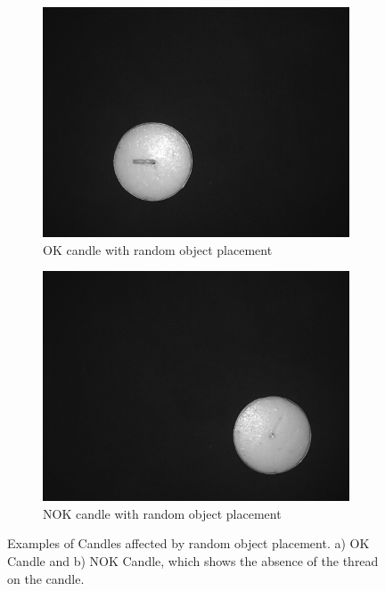 \documentclass[12pt,DIV14,BCOR12mm,a4paper,footinclude=false,headinclude,parskip=half-,twoside,openright,cleardoublepage=empty,toc=index,bibliography=totoc,listof=totoc]{scrreprt}
\numberwithin{equation}{chapter}
\begin{document}
\begin{enumerate}
	\begin{figure}
		\centering
		\begin{subfigure}[b]{0.45\textwidth}
			\centering
			\includegraphics[scale=0.15]{../media/Candles-influence-random-OK.png}
			\caption{OK candle with random object placement}
		\end{subfigure}
		\hfill
		\begin{subfigure}[b]{0.45\textwidth}
			\centering
			\includegraphics[scale=0.15]{../media/Candles-influence-random-NOK.png}
			\caption{NOK candle with random object placement}
		\end{subfigure}
		\caption{Examples of Candles affected by random object placement. a) OK Candle and b) NOK Candle, which shows the absence of the thread on the candle.}
		\label{fig:random_object_placement_candles}
	\end{figure}
	

\end{enumerate}
\end{document}
